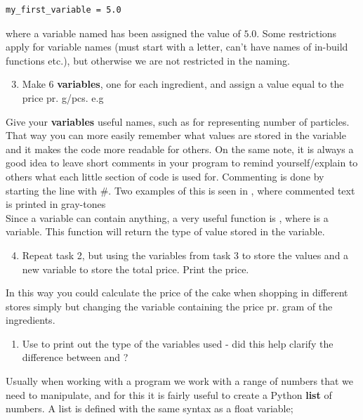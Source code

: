\documentclass{article}
\begin{document}
\begin{lstlisting}
my_first_variable = 5.0
\end{lstlisting}

where a variable named  has been assigned the value
of $5.0$.
Some restrictions apply for variable names (must start with a letter, can't have names of
in-build functions etc.), but otherwise we are not restricted in the naming. 

\begin{enumerate}
  \setcounter{enumi}{2}
  \item Make 6 {\bf variables}, one for each ingredient, and assign a value equal to the price pr. g/pcs. e.g 
\end{enumerate}

Give your {\bf variables} useful names, such as  for representing number of particles. That way you can more easily remember what values are stored in the variable and it makes the code more readable for others. On the same note, it is always a good idea to leave short comments in your program to remind yourself/explain to others what each little section of code is used for. Commenting is done by starting the line with \#. Two examples of this is seen in , where commented text is printed in gray-tones \\

Since a variable can contain anything, a very useful function is ,
where  is a variable. This function will return the type of value stored
in the variable.

\begin{enumerate}
  \setcounter{enumi}{3}
  \item Repeat task 2, but using the variables from task 3 to store the values and a new variable to store the total price. Print the price.
\end{enumerate}
In this way you could calculate the price of the cake when shopping in different stores simply but changing the variable containing the price pr. gram of the ingredients. 
\begin{enumerate}[resume]
  \item Use  to print out the type of the variables used - did this help clarify the difference between  and ?
\end{enumerate}

Usually when working with a program we work with a range of numbers
that we need to manipulate, and for this it is fairly useful to create a Python {\bf list}
of numbers.
A list is defined with the same syntax as a float variable;
\end{document}
